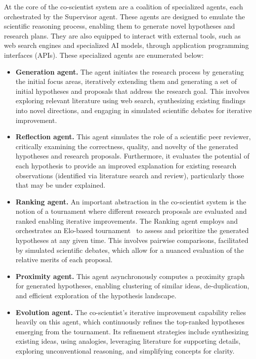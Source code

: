 At the core of the co-scientist system are a coalition of specialized agents, each orchestrated by the Supervisor agent. These agents are designed to emulate the scientific reasoning process, enabling them to generate novel hypotheses and research plans. They are also equipped to interact with external tools, such as web search engines and specialized AI models, through application programming interfaces (APIs). These specialized agents are enumerated below:

\begin{itemize}
    \item \textbf{Generation agent.} The agent initiates the research process by generating the initial focus areas, iteratively extending them and generating a set of initial hypotheses and proposals that address the research goal. This involves exploring relevant literature using web search, synthesizing existing findings into novel directions, and engaging in simulated scientific debates for iterative improvement.
    \item \textbf{Reflection agent.} This agent simulates the role of a scientific peer reviewer, critically examining the correctness, quality, and novelty of the generated hypotheses and research proposals. Furthermore, it evaluates the potential of each hypothesis to provide an improved explanation for existing research observations (identified via literature search and review), particularly those that may be under explained.
    \item \textbf{Ranking agent.} An important abstraction in the co-scientist system is the notion of a tournament where different research proposals are evaluated and ranked enabling iterative improvements. The Ranking agent employs and orchestrates an Elo-based tournament~\cite{elo1978rating} to assess and prioritize the generated hypotheses at any given time. This involves pairwise comparisons, facilitated by simulated scientific debates, which allow for a nuanced evaluation of the relative merits of each proposal.
    \item \textbf{Proximity agent.} This agent asynchronously computes a proximity graph for generated hypotheses, enabling clustering of similar ideas, de-duplication, and efficient exploration of the hypothesis landscape.
    \item \textbf{Evolution agent.} The co-scientist's iterative improvement capability relies heavily on this agent, which continuously refines the top-ranked hypotheses emerging from the tournament.  Its refinement strategies include synthesizing existing ideas, using analogies, leveraging literature for supporting details, exploring unconventional reasoning, and simplifying concepts for clarity.

\end{itemize}
